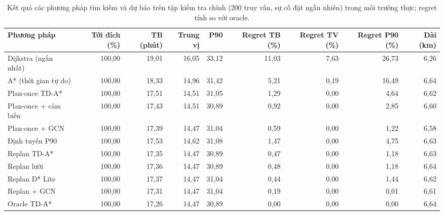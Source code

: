 \begin{table}[!htbp]
\centering
\small
\caption{Kết quả các phương pháp tìm kiếm và dự báo trên tập kiểm tra chính (200 truy vấn, sự cố đặt ngẫu nhiên) trong môi trường thực; regret tính so với oracle.}
\label{tab:tab_main_classic}
\begin{adjustbox}{max width=\linewidth}
\begin{tabular}{lrrrrrrrr}
\toprule
Phương pháp & Tới đích (\%) & TB (phút) & Trung vị & P90 & Regret TB (\%) & Regret TV (\%) & Regret P90 (\%) & Dài (km) \\
\midrule
Dijkstra (ngắn nhất) & 100{,}00 & 19{,}01 & 16{,}05 & 33{,}12 & 11{,}03 & 7{,}63 & 26{,}73 & 6{,}26 \\
A* (thời gian tự do) & 100{,}00 & 18{,}33 & 14{,}96 & 31{,}42 & 5{,}21 & 0{,}19 & 16{,}49 & 6{,}64 \\
Plan-once TD-A* & 100{,}00 & 17{,}51 & 14{,}51 & 31{,}05 & 1{,}29 & 0{,}00 & 4{,}64 & 6{,}62 \\
Plan-once + cảm biến & 100{,}00 & 17{,}43 & 14{,}51 & 30{,}89 & 0{,}92 & 0{,}00 & 2{,}85 & 6{,}60 \\
Plan-once + GCN & 100{,}00 & 17{,}39 & 14{,}47 & 31{,}04 & 0{,}59 & 0{,}00 & 1{,}22 & 6{,}58 \\
Định tuyến P90 & 100{,}00 & 17{,}53 & 14{,}62 & 31{,}08 & 1{,}47 & 0{,}00 & 4{,}75 & 6{,}63 \\
Replan TD-A* & 100{,}00 & 17{,}35 & 14{,}47 & 30{,}89 & 0{,}47 & 0{,}00 & 1{,}18 & 6{,}63 \\
Replan lười & 100{,}00 & 17{,}36 & 14{,}47 & 30{,}89 & 0{,}48 & 0{,}00 & 1{,}18 & 6{,}64 \\
Replan D* Lite & 100{,}00 & 17{,}37 & 14{,}47 & 31{,}04 & 0{,}44 & 0{,}00 & 1{,}44 & 6{,}62 \\
Replan + GCN & 100{,}00 & 17{,}31 & 14{,}47 & 31{,}04 & 0{,}19 & 0{,}00 & 0{,}01 & 6{,}61 \\
Oracle TD-A* & 100{,}00 & 17{,}26 & 14{,}47 & 30{,}89 & 0{,}00 & 0{,}00 & 0{,}00 & 6{,}64 \\
\bottomrule
\end{tabular}
\end{adjustbox}
\end{table}

